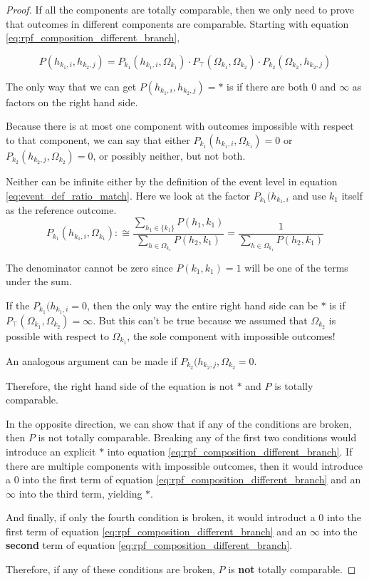 \documentclass[twoside]{article}
\theoremstyle{plain}%
\theoremstyle{definition}
\theoremstyle{remark}
\begin{document}
\begin{proof}
If all the components are totally comparable, then we only need to prove that outcomes in different components are comparable. Starting with equation \ref{eq:rpf_composition_different_branch},

\begin{equation}
P(h_{k_1, i}, h_{k_2, j}) = P_{k_1}(h_{k_1, i}, \Omega_{k_1}) \cdot  P_{\top}(\Omega_{k_1}, \Omega_{k_2}) \cdot P_{k_2}(\Omega_{k_2}, h_{k_2, j})
\end{equation}

The only way that we can get \(P(h_{k_1, i}, h_{k_2, j}) = \ast\) is if there are both \(0\) and \(\infty\) as factors on the right hand side.

Because there is at most one component with outcomes impossible with respect to that component, we can say that either \(P_{k_1}(h_{k_1, i}, \Omega_{k_1}) = 0\) or \(P_{k_2}(h_{k_2, j}, \Omega_{k_2}) = 0\), or possibly neither, but not both.

Neither can be infinite either by the definition of the event level in equation \ref{eq:event_def_ratio_match}. Here we look at the factor \(P_{k_1}(h_{k_1, i}\) and use \(k_1\) itself as the reference outcome.
\[
P_{k_1}(h_{k_1, i}, \Omega_{k_1}) :\cong \frac{\sum_{h_1 \in \{k_1\}} P(h_1, k_1)}{\sum_{h \in \Omega_{k_1}} P(h_2, k_1)} = \frac{1}{\sum_{h \in \Omega_{k_1}} P(h_2, k_1)}
\]

The denominator cannot be zero since \(P(k_1, k_1) = 1\) will be one of the terms under the sum.

If the \(P_{k_1}(h_{k_1, i} = 0\), then the only way the entire right hand side can be \(\ast\) is if \(P_{\top}(\Omega_{k_1}, \Omega_{k_2}) = \infty\). But this can't be true because we assumed that \(\Omega_{k_2}\) is possible with respect to \(\Omega_{k_1}\), the sole component with impossible outcomes!

An analogous argument can be made if \(P_{k_2}(h_{k_2, j}, \Omega_{k_2} = 0\).

Therefore, the right hand side of the equation is not \(\ast\) and \(P\) is totally comparable.

In the opposite direction, we can show that if any of the conditions are broken, then \(P\) is not totally comparable. Breaking any of the first two conditions would introduce an explicit \(\ast\) into equation \ref{eq:rpf_composition_different_branch}. If there are multiple components with impossible outcomes, then it would introduce a \(0\) into the first term of equation \ref{eq:rpf_composition_different_branch} and an \(\infty\) into the third term, yielding \(\ast\).

And finally, if only the fourth condition is broken, it would introduct a 0 into the first term of equation \ref{eq:rpf_composition_different_branch} and an \(\infty\) into the \textbf{second} term of equation \ref{eq:rpf_composition_different_branch}.

Therefore, if any of these conditions are broken, \(P\) is \textbf{not} totally comparable.
\end{proof}
\end{document}
